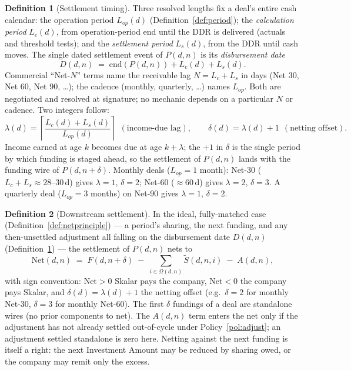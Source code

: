 \documentclass[11pt, a4paper]{article}
\theoremstyle{definition}
\newtheorem{definition}{Definition}[section]
\newcommand{\src}[1]{}
\newcommand{\GCCIA}{upstream facility}
\newcommand{\KCIA}{downstream agreement}
\newcommand{\FudoTS}{downstream term sheet}
\newcommand{\Stil}{\tilde{S}}                     %
\newcommand{\OO}{\Omega}                          %
\begin{document}
\begin{definition}[Settlement timing]\label{def:nettiming}
Three resolved lengths fix a deal's entire cash calendar: the operation period $L_{op}(d)$ (Definition~\ref{def:period}); the \emph{calculation period} $L_c(d)$, from operation-period end until the DDR is delivered (actuals and threshold tests); and the \emph{settlement period} $L_s(d)$, from the DDR until cash moves. The single dated settlement event of $P(d,n)$ is its \emph{disbursement date}
\[
D(d, n) \;=\; \mathrm{end}(P(d,n)) + L_c(d) + L_s(d).
\]
Commercial ``Net-$N$'' terms name the receivable lag $N = L_c + L_s$ in days (Net 30, Net 60, Net 90, \dots); the cadence (monthly, quarterly, \dots) names $L_{op}$. Both are negotiated and resolved at signature; no mechanic depends on a particular $N$ or cadence. Two integers follow:
\[
\lambda(d) = \left\lceil \frac{L_c(d) + L_s(d)}{L_{op}(d)} \right\rceil \ \ (\text{income-due lag}),
\qquad
\delta(d) = \lambda(d) + 1 \ \ (\text{netting offset}).
\]
Income earned at age $k$ becomes due at age $k + \lambda$; the $+1$ in $\delta$ is the single period by which funding is staged ahead, so the settlement of $P(d,n)$ lands with the funding wire of $P(d, n{+}\delta)$. Monthly deals ($L_{op} = 1$ month): Net-30 ($L_c{+}L_s \approx 28$--$30$\,d) gives $\lambda = 1$, $\delta = 2$; Net-60 ($\approx 60$\,d) gives $\lambda = 2$, $\delta = 3$. A quarterly deal ($L_{op} = 3$ months) on Net-90 gives $\lambda = 1$, $\delta = 2$.
\src{\KCIA{} \S2.2(b), ``Disbursement Date'' (one-month calc $+$ one-month settle); \FudoTS{} ``Net 30'' ($14+14$); \GCCIA{} \S2.2(b)--(c).}
\end{definition}

\begin{definition}[Downstream settlement]\label{def:netdown}
In the ideal, fully-matched case (Definition~\ref{def:netprinciple}) --- a period's sharing, the next funding, and any then-unsettled adjustment all falling on the disbursement date $D(d,n)$ (Definition~\ref{def:nettiming}) --- the settlement of $P(d, n)$ nets to
\begin{equation}\label{eq:netdown}
\mathrm{Net}(d, n) \;=\; F(d, n{+}\delta) \;-\; \sum_{i \in \OO(d, n)} \Stil(d, n, i) \;-\; A(d, n),
\end{equation}
with sign convention: $\mathrm{Net} > 0$ Skalar pays the company, $\mathrm{Net} < 0$ the company pays Skalar, and $\delta(d) = \lambda(d) + 1$ the netting offset (e.g.\ $\delta = 2$ for monthly Net-30, $\delta = 3$ for monthly Net-60). The first $\delta$ fundings of a deal are standalone wires (no prior components to net). The $A(d,n)$ term enters the net only if the adjustment has not already settled out-of-cycle under Policy~\ref{pol:adjust}; an adjustment settled standalone is zero here. Netting against the next funding is itself a right: the next Investment Amount may be reduced by sharing owed, or the company may remit only the excess.
\src{\KCIA{} \S2.1(c), \S2.2(a)--(b); TS ``Cash Flow Mechanics (Net 60 Payments)''.}
\end{definition}
\end{document}
